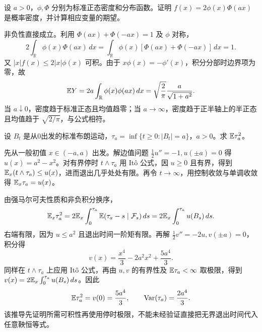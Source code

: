 \begin{example}[原题3：偏斜正态密度与均值]\label{yau:2026-3}
设 $a>0$，$\phi,\Phi$ 分别为标准正态密度和分布函数。证明 $f(x)=2\phi(x)\Phi(ax)$ 是概率密度，并计算相应变量的期望。
\end{example}
\begin{solve}
非负性直接成立。利用 $\Phi(ax)+\Phi(-ax)=1$ 及 $\phi$ 对称，
\[
2\int_{\mathbb R}\phi(x)\Phi(ax)\,dx=\int_{\mathbb R}\phi(x)[\Phi(ax)+\Phi(-ax)]\,dx=1.
\]
又 $|x|f(x)\le2|x|\phi(x)$ 可积。由于 $x\phi(x)=-\phi'(x)$，积分分部时边界项为零，故
\[
\mathbb E Y=2a\int_{\mathbb R}\phi(x)\phi(ax)\,dx
=\sqrt{\frac2\pi}\frac a{\sqrt{1+a^2}}.
\]
当 $a\downarrow0$，密度趋于标准正态且均值趋零；当 $a\to\infty$，密度趋于正半轴上的半正态且均值趋于 $\sqrt{2/\pi}$，与公式相符。
\end{solve}

\begin{example}[原题4：布朗运动对称区间退出时间的二阶矩]\label{yau:2026-4}
设 $B_t$ 是从0出发的标准布朗运动，$\tau_a=\inf\{t\ge0:|B_t|=a\}$，$a>0$。求 $\mathbb E\tau_a^2$。
\end{example}
\begin{solve}
先从一般初值 $x\in(-a,a)$ 出发。解边值问题 $\tfrac12u''=-1,u(\pm a)=0$ 得 $u(x)=a^2-x^2$。对有界停时 $t\wedge\tau_a$ 用 Itô 公式，因 $u\ge0$ 且有界，得到 $\mathbb E_x(t\wedge\tau_a)\le u(x)$，进而退出几乎处处有限。再令 $t\to\infty$，用控制收敛与单调收敛得 $\mathbb E_x\tau_a=u(x)$。

由强马尔可夫性质和非负积分换序，
\[
\mathbb E_x\tau_a^2=2\mathbb E_x\int_0^{\tau_a}\mathbb E(\tau_a-s\mid\mathcal F_s)\,ds
=2\mathbb E_x\int_0^{\tau_a}u(B_s)\,ds.
\]
右端有限，因为 $u\le a^2$ 且退出时间一阶矩有限。再解 $\tfrac12v''=-2u,v(\pm a)=0$，积分得
\[
v(x)=\frac{x^4}{3}-2a^2x^2+\frac{5a^4}{3}.
\]
同样在 $t\wedge\tau_a$ 上应用 Itô 公式，再由 $u,v$ 的有界性及 $\mathbb E\tau_a<\infty$ 取极限，得到 $v(x)=2\mathbb E_x\int_0^{\tau_a}u(B_s)\,ds$。因此
\[
\mathbb E\tau_a^2=v(0)=\frac{5a^4}{3},\qquad \operatorname{Var}(\tau_a)=\frac{2a^4}{3}.
\]
该推导先证明所需可积性再使用停时极限，不能未经验证直接把无界退出时间代入任意鞅恒等式。
\end{solve}







